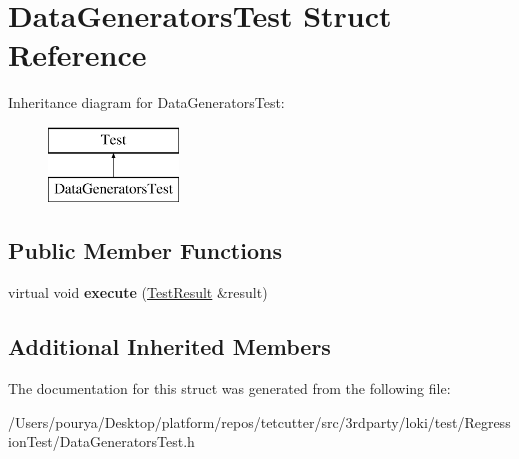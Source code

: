 \hypertarget{structDataGeneratorsTest}{}\section{Data\+Generators\+Test Struct Reference}
\label{structDataGeneratorsTest}
Inheritance diagram for Data\+Generators\+Test\+:\begin{figure}[H]
\begin{center}
\leavevmode
\includegraphics[height=2.000000cm]{structDataGeneratorsTest}
\end{center}
\end{figure}
\subsection*{Public Member Functions}
\begin{DoxyCompactItemize}
\item 
\hypertarget{structDataGeneratorsTest_a802e7d06c487140efda1c3cc84cb4e61}{}virtual void {\bfseries execute} (\hyperlink{classTestResult}{Test\+Result} \&result)\label{structDataGeneratorsTest_a802e7d06c487140efda1c3cc84cb4e61}

\end{DoxyCompactItemize}
\subsection*{Additional Inherited Members}


The documentation for this struct was generated from the following file\+:\begin{DoxyCompactItemize}
\item 
/\+Users/pourya/\+Desktop/platform/repos/tetcutter/src/3rdparty/loki/test/\+Regression\+Test/Data\+Generators\+Test.\+h\end{DoxyCompactItemize}
